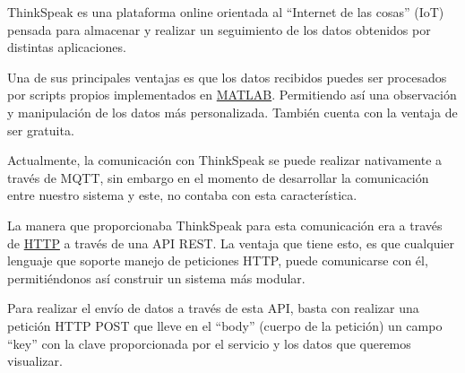 ThinkSpeak es una plataforma online orientada al ``Internet de las cosas'' (IoT) pensada para almacenar y realizar un seguimiento de los datos obtenidos por distintas aplicaciones.

Una de sus principales ventajas es que los datos recibidos puedes ser procesados por scripts propios implementados en \href{https://es.mathworks.com/products/matlab.html}{MATLAB}. Permitiendo así una observación y manipulación de los datos más personalizada. También cuenta con la ventaja de ser gratuita.

Actualmente, la comunicación con ThinkSpeak se puede realizar nativamente a través de MQTT, sin embargo en el momento de desarrollar la comunicación entre nuestro sistema y este, no contaba con esta característica.

La manera que proporcionaba ThinkSpeak para esta comunicación era a través de \href{https://es.wikipedia.org/wiki/Hypertext_Transfer_Protocol}{HTTP} a través de una API REST. La ventaja que tiene esto, es que cualquier lenguaje que soporte manejo de peticiones HTTP, puede comunicarse con él, permitiéndonos así construir un sistema más modular.

Para realizar el envío de datos a través de esta API, basta con realizar una petición HTTP POST que lleve en el ``body'' (cuerpo de la petición) un campo ``key'' con la clave proporcionada por el servicio y los datos que queremos visualizar.